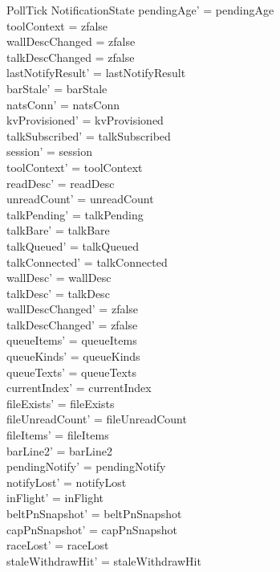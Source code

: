 \documentclass[a4paper,10pt,fleqn]{article}
\begin{document}
\begin{schema}{PollTick}
  \Delta NotificationState
  \where
  pendingAge' = pendingAge \\
  toolContext = zfalse \\
  wallDescChanged = zfalse \\
  talkDescChanged = zfalse \\
  lastNotifyResult' = lastNotifyResult \\
  barStale' = barStale \\
  natsConn' = natsConn \\
  kvProvisioned' = kvProvisioned \\
  talkSubscribed' = talkSubscribed \\
  session' = session \\
  toolContext' = toolContext \\
  readDesc' = readDesc \\
  unreadCount' = unreadCount \\
  talkPending' = talkPending \\
  talkBare' = talkBare \\
  talkQueued' = talkQueued \\
  talkConnected' = talkConnected \\
  wallDesc' = wallDesc \\
  talkDesc' = talkDesc \\
  wallDescChanged' = zfalse \\
  talkDescChanged' = zfalse \\
  queueItems' = queueItems \\
  queueKinds' = queueKinds \\
  queueTexts' = queueTexts \\
  currentIndex' = currentIndex \\
  fileExists' = fileExists \\
  fileUnreadCount' = fileUnreadCount \\
  fileItems' = fileItems \\
  barLine2' = barLine2 \\
  pendingNotify' = pendingNotify \\
  notifyLost' = notifyLost \\
  inFlight' = inFlight \\
  beltPnSnapshot' = beltPnSnapshot \\
  capPnSnapshot' = capPnSnapshot \\
  raceLost' = raceLost \\
  staleWithdrawHit' = staleWithdrawHit \\

\end{schema}
\end{document}

